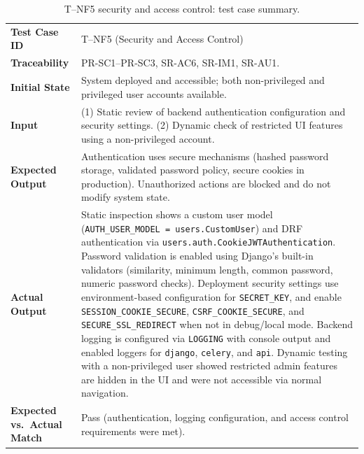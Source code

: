 \documentclass[12pt, titlepage]{article}
\begin{document}
\begin{table}[H]
  \centering
  \caption{T--NF5 security and access control: test case summary.}
  \label{tab:tnf5-summary}
  \begin{tabular}{@{}p{}p{}@{}}
    \toprule
    \textbf{Test Case ID} &
      T--NF5 (Security and Access Control) \\
    \textbf{Traceability} &
      PR-SC1--PR-SC3, SR-AC6, SR-IM1, SR-AU1. \\
    \textbf{Initial State} &
      System deployed and accessible; both non-privileged and privileged user
      accounts available. \\
    \textbf{Input} &
      (1) Static review of backend authentication configuration and security
      settings.  (2) Dynamic check of restricted UI features using a
      non-privileged account. \\
    \textbf{Expected Output} &
      Authentication uses secure mechanisms (hashed password storage, validated
      password policy, secure cookies in production).  Unauthorized actions are
      blocked and do not modify system state. \\
    \textbf{Actual Output} &
      Static inspection shows a custom user model
      (\texttt{AUTH\_USER\_MODEL = users.CustomUser}) and DRF authentication via
      \texttt{users.auth.CookieJWTAuthentication}.  Password validation is
      enabled using Django's built-in validators (similarity, minimum length,
      common password, numeric password checks).  Deployment security settings
      use environment-based configuration for \texttt{SECRET\_KEY}, and enable
      \texttt{SESSION\_COOKIE\_SECURE}, \texttt{CSRF\_COOKIE\_SECURE}, and
      \texttt{SECURE\_SSL\_REDIRECT} when not in debug/local mode.  Backend
      logging is configured via \texttt{LOGGING} with console output and
      enabled loggers for \texttt{django}, \texttt{celery}, and \texttt{api}.
      Dynamic testing with a non-privileged user showed restricted admin
      features are hidden in the UI and were not accessible via normal
      navigation. \\
    \textbf{Expected vs.\ Actual Match} &
      Pass (authentication, logging configuration, and access control
      requirements were met). \\
    \bottomrule
  \end{tabular}
\end{table}
\end{document}
